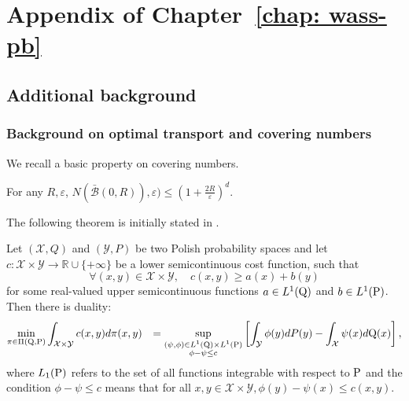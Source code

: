 \chapter{Appendix of Chapter~\ref{chap: wass-pb}}
\label{ap:mv-sto}

\minitoc

\begin{noaddcontents}

\section{Additional background}
\label{sec: background}

\subsection{Background on optimal transport and covering numbers}
\label{sec: back_compact}



We recall a basic property on covering numbers.

\begin{proposition}
\label{prop: covering}
For any $R,\varepsilon$, $N(\bar{\mathcal{B}}(0,R)), \varepsilon) \leq \left(1+\frac{2R}{\varepsilon}\right)^d$.
\end{proposition}
The following theorem is initially stated in \citep[Theorem 5.10]{villani2009optimal}.
\begin{theorem}
\label{th: kanto_dual}
Let $(\mathcal{X}, Q)$ and $(\mathcal{Y}, P)$ be two Polish probability spaces and let $c: \mathcal{X} \times \mathcal{Y} \rightarrow \mathbb{R} \cup\{+\infty\}$ be a lower semicontinuous cost function, such that
$$
\forall(x, y) \in \mathcal{X} \times \mathcal{Y}, \quad c(x, y) \geq a(x)+b(y)
$$
for some real-valued upper semicontinuous functions $a \in L^1(\Q)$ and $b \in L^1(\P)$. Then there is duality:
$$
\begin{aligned}
\min _{\pi \in \Pi(\Q,\P)} & \int_{\mathcal{X} \times \mathcal{Y}} c(x, y) d \pi(x, y) & =\sup _{\substack{(\psi, \phi) \in L^1(\Q) \times L^1(\P)\\ \phi-\psi \leq c}}\left[\int_{\mathcal{Y}} \phi(y) dP(y)-\int_{\mathcal{X}} \psi(x) d\Q(x)\right],
\end{aligned}
$$
where $L_1(\P)$ refers to the set of all functions integrable with respect to $\P$ and the condition $\phi-\psi \leq c$ means that for all $x,y \in \mathcal{X}\times \mathcal{Y}, \phi(y)-\psi(x) \leq c(x,y)$.
\end{theorem}



\end{noaddcontents}
